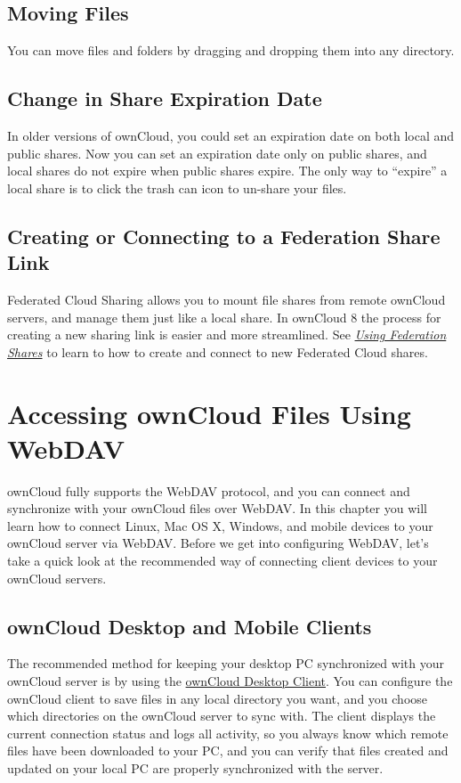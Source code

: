 \documentclass[letterpaper,10pt,english]{sphinxmanual}
\begin{document}
\subsection{Moving Files}
\label{files/access_webgui:moving-files}
You can move files and folders by dragging and dropping them into any directory.


\subsection{Change in Share Expiration Date}
\label{files/access_webgui:change-in-share-expiration-date}
In older versions of ownCloud, you could set an expiration date on both local
and public shares. Now you can set an expiration date only on public shares,
and local shares do not expire when public shares expire. The only way to
``expire'' a local share is to click the trash can icon to un-share your files.


\subsection{Creating or Connecting to a Federation Share Link}
\label{files/access_webgui:creating-or-connecting-to-a-federation-share-link}
Federated Cloud Sharing allows you to mount file shares from remote ownCloud
servers, and manage them just like a local share. In ownCloud 8 the process for
creating a new sharing link is easier and more streamlined. See
{\hyperref[files/federated_cloud_sharing::doc]{\emph{\emph{Using Federation Shares}}}} to learn to how to create and connect to new
Federated Cloud shares.


\section{Accessing ownCloud Files Using WebDAV}
\label{files/access_webdav:accessing-owncloud-files-using-webdav}\label{files/access_webdav::doc}
ownCloud fully supports the WebDAV protocol, and you can connect and synchronize
with your ownCloud files over WebDAV.  In this chapter you will learn how to
connect Linux, Mac OS X, Windows, and mobile devices to your ownCloud server via
WebDAV. Before we get into configuring WebDAV, let's take a quick look at the
recommended way of connecting client devices to your ownCloud servers.


\subsection{ownCloud Desktop and Mobile Clients}
\label{files/access_webdav:owncloud-desktop-and-mobile-clients}
The recommended method for keeping your desktop PC synchronized with your
ownCloud server is by using the \href{https://owncloud.org/install/\#install-clients}{ownCloud Desktop Client}. You can configure the ownCloud client
to save files in any local directory you want, and you choose which directories
on the ownCloud server to sync with. The client displays the current connection
status and logs all activity, so you always know which remote files have been
downloaded to your PC, and you can verify that files created and updated on your
local PC are properly synchronized with the server.
\end{document}
